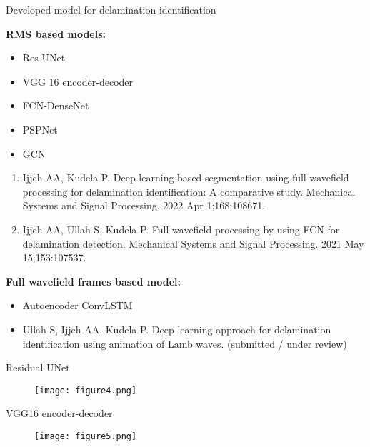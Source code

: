 \documentclass[10pt,aspectratio=169]{beamer} %
\begin{document}
\begin{frame}{Developed model for delamination identification}
	\begin{minipage}[t]{0.45\textwidth}
		\textbf{RMS based models: \\}
			\begin{itemize}
				\item Res-UNet
				\item VGG 16 encoder-decoder
				\item FCN-DenseNet
				\item PSPNet
				\item GCN
			\end{itemize}
		{\tiny 
			\begin{enumerate}
				\item Ijjeh AA, Kudela P. Deep learning based segmentation using full wavefield processing for delamination identification: A comparative study. Mechanical Systems and Signal Processing. 2022 Apr 1;168:108671.
				\item Ijjeh AA, Ullah S, Kudela P. Full wavefield processing by using FCN for delamination detection. Mechanical Systems and Signal Processing. 2021 May 15;153:107537.
				
			\end{enumerate}}
	\end{minipage}
	\hfill
	\begin{minipage}[t]{.45\textwidth}
	\textbf{Full wavefield frames based model:}
		\begin{itemize}
			\item Autoencoder ConvLSTM
		\end{itemize}
	\tiny
	\begin{itemize}
		\item Ullah S, Ijjeh AA, Kudela P. Deep learning approach for delamination identification using animation of Lamb waves. (submitted / under review)
	\end{itemize}
	
	\end{minipage}
\end{frame}

\begin{frame}{Residual UNet}
	\begin{figure}
		\centering
		\texttt{[image: figure4.png]}
	\end{figure}
\end{frame}

\begin{frame}{VGG16 encoder-decoder}
	\begin{figure}
		\centering
		\texttt{[image: figure5.png]}
	\end{figure}
\end{frame}
\end{document}
